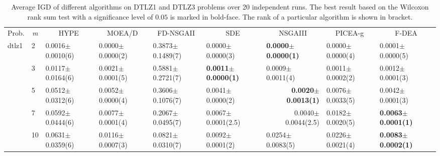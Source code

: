 \begin{table*}[htbp]
\centering

\caption{Average IGD of different algorithms on DTLZ1 and DTLZ3 problems over 20 independent runs. The best result based on the Wilcoxon rank sum test with a significance level of $0.05$ is marked in bold-face. The rank of a particular algorithm is shown in bracket.}
\label{table:dtlzIGD}
\renewcommand{\arraystretch}{1.1}
\begin{adjustbox}{width=1.0\textwidth,center}
\begin{tabular}{lllllllll}
\thickhline
Prob. & \multicolumn{1}{c}{\textit{m}} & \multicolumn{1}{c}{HYPE} & \multicolumn{1}{c}{MOEA/D} & \multicolumn{1}{c}{FD-NSGAII} & \multicolumn{1}{c}{SDE}   & \multicolumn{1}{c}{NSGAIII}                   & \multicolumn{1}{c}{PICEA-g}          & \multicolumn{1}{c}{F-DEA} \\\thickhline
dtlz1 & 2                              & 0.0016$\pm$0.0010(6)         & 0.0000$\pm$0.0000(2)          & 0.3873$\pm$0.1489(7)              & 0.0000$\pm$0.0000(3)          & \textbf{0.0000$\pm$0.0000(1)}                     & 0.0000$\pm$0.0000(4)                     & 0.0001$\pm$0.0000(5)          \\
      & 3                              & 0.0117$\pm$0.0164(6)         & 0.0021$\pm$0.0001(5)          & 0.5881$\pm$0.2721(7)              & \textbf{0.0011$\pm$0.0000(1)} & 0.0009$\pm$0.0011(4)                              & 0.0011$\pm$0.0002(2)                     & 0.0012$\pm$0.0001(3)          \\
      & 5                              & 0.0512$\pm$0.0312(6)         & 0.0052$\pm$0.0000(4)          & 0.3606$\pm$0.1076(7)              & 0.0041$\pm$0.0000(2)          & \multicolumn{1}{r}{\textbf{0.0020$\pm$0.0013(1)}} & 0.0076$\pm$0.0033(5)                     & 0.0042$\pm$0.0001(3)          \\
      & 7                              & 0.0592$\pm$0.0444(6)         & 0.0077$\pm$0.0001(4)          & 0.2067$\pm$0.0495(7)              & 0.0067$\pm$0.0001(2.5)        & \multicolumn{1}{r}{0.0040$\pm$0.0044(2.5)}        & 0.0182$\pm$0.0020(5)                     & \textbf{0.0063$\pm$0.0001(1)} \\
      & 10                             & 0.0631$\pm$0.0359(6)         & 0.0116$\pm$0.0007(3)          & 0.0821$\pm$0.0310(7)              & 0.0092$\pm$0.0001(2)          & 0.0254$\pm$0.0083(5)                              & 0.0226$\pm$0.0021(4)                     & \textbf{0.0083$\pm$0.0002(1)} \\

\end{tabular}
\end{adjustbox}
\end{table*}

